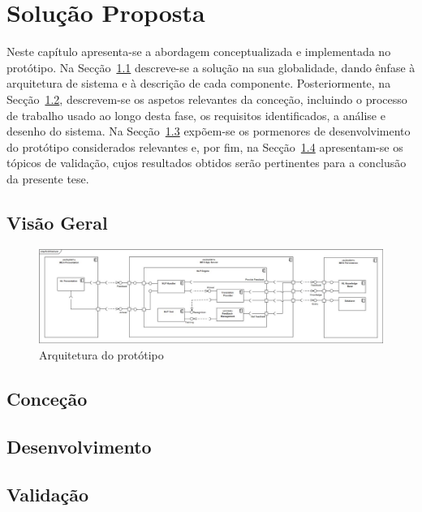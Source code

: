 \chapter{Solução Proposta}
\label{chap:Chapter4}
Neste capítulo apresenta-se a abordagem conceptualizada e implementada no protótipo. Na Secção~\ref{sec:chap04_general_vision} descreve-se a solução na sua globalidade, dando ênfase à arquitetura de sistema e à descrição de cada componente. Posteriormente, na Secção~\ref{sec:chap04_conception}, descrevem-se os aspetos relevantes da conceção, incluindo o processo de trabalho usado ao longo desta fase, os requisitos identificados, a análise e desenho do sistema. Na Secção~\ref{sec:chap04_development} expõem-se os pormenores de desenvolvimento do protótipo considerados relevantes e, por fim, na Secção~\ref{sec:chap04_validation} apresentam-se os tópicos de validação, cujos resultados obtidos serão pertinentes para a conclusão da presente tese.

\section{Visão Geral} 
\label{sec:chap04_general_vision}

\begin{figure}
    \centering
    \includegraphics[width=\textwidth]{ch04/assets/Architecture.jpg}
    \caption{Arquitetura do protótipo}
    \label{fig:prototype_architecture}
\end{figure}

\tbd

\section{Conceção} 
\label{sec:chap04_conception}
\tbd

\section{Desenvolvimento} 
\label{sec:chap04_development}
\tbd

\section{Validação} 
\label{sec:chap04_validation}
\tbd
